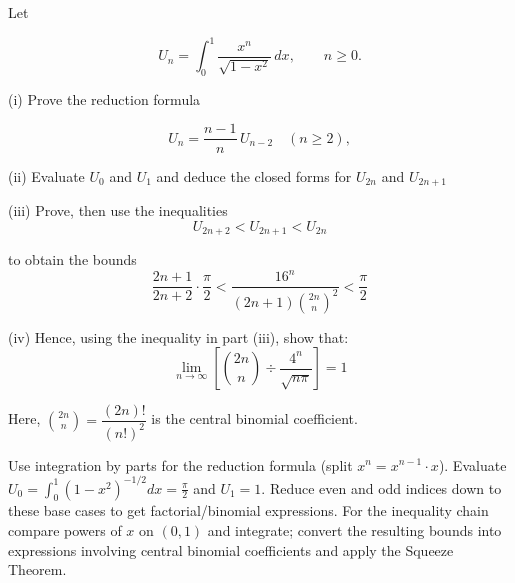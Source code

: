 \begin{problem}
Let

\[U_n=\int_0^1 \frac{x^n}{\sqrt{1-x^2}}\,dx,\qquad n\ge0.\]

(i) Prove the reduction formula

\[U_n=\frac{n-1}{n}\,U_{n-2}\quad(n\ge2),\]


(ii) Evaluate $U_0$ and $U_1$ and deduce the closed forms for $U_{2n}$ and $U_{2n+1}$

(iii) Prove, then use the inequalities
\[U_{2n+2}<U_{2n+1}<U_{2n}\]

to obtain the bounds
\[\frac{2n+1}{2n+2}\cdot\frac{\pi}{2}<\frac{16^n}{(2n+1)\binom{2n}{n}^2}<\frac{\pi}{2}\]

(iv) Hence, using the inequality in part (iii), show that:
$$
\lim_{n \to \infty} \left[ \binom{2n}{n} \div \frac{4^n}{\sqrt{n\pi}} \right] = 1
$$


Here, $\binom{2n}{n}=\dfrac{(2n)!}{(n!)^2}$ is the central binomial coefficient.

\end{problem}

\begin{hint}
Use integration by parts for the reduction formula (split $x^n=x^{n-1}\cdot x$). Evaluate $U_0=\int_0^1(1-x^2)^{-1/2}dx=\frac{\pi}{2}$ and $U_1=1$. Reduce even and odd indices down to these base cases to get factorial/binomial expressions. For the inequality chain compare powers of $x$ on $(0,1)$ and integrate; convert the resulting bounds into expressions involving central binomial coefficients and apply the Squeeze Theorem.
\end{hint}

